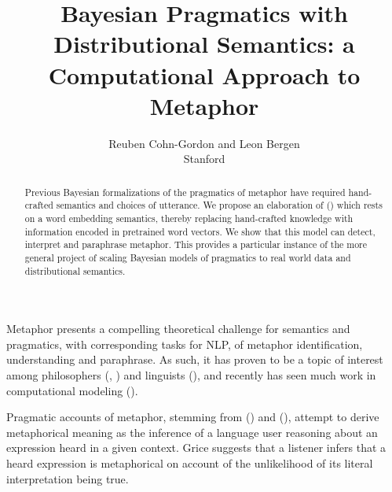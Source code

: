 \documentclass[10pt,letterpaper,twocolumn]{article}
\title{Bayesian Pragmatics with Distributional Semantics: a Computational Approach to Metaphor}
\author{Reuben Cohn-Gordon and Leon Bergen \\ Stanford}
\date{}
\begin{document}
\maketitle



\begin{abstract}
\small
Previous Bayesian formalizations of the pragmatics of metaphor have required hand-crafted semantics and choices of utterance. We propose an elaboration of (\cite{kao}) which rests on a word embedding semantics, thereby replacing hand-crafted knowledge with information encoded in pretrained word vectors. We show that this model can detect, interpret and paraphrase metaphor. This provides a particular instance of the more general project of scaling Bayesian models of pragmatics to real world data and distributional semantics.
\end{abstract}





Metaphor presents a compelling theoretical challenge for semantics and pragmatics, with corresponding tasks for NLP, of metaphor identification, understanding and paraphrase. As such, it has proven to be a topic of interest among philosophers (\cite{black}, \cite{davidson}) and linguists (\cite{lakoff2008metaphors}), and recently has seen much work in computational modeling (\cite{shutova2016design}). 


Pragmatic accounts of metaphor, stemming from (\cite{davidson}) and (\cite{grice}), attempt to derive metaphorical meaning as the inference of a language user reasoning about an expression heard in a given context. Grice suggests that a listener infers that a heard expression is metaphorical on account of the unlikelihood of its literal interpretation being true.
\end{document}
